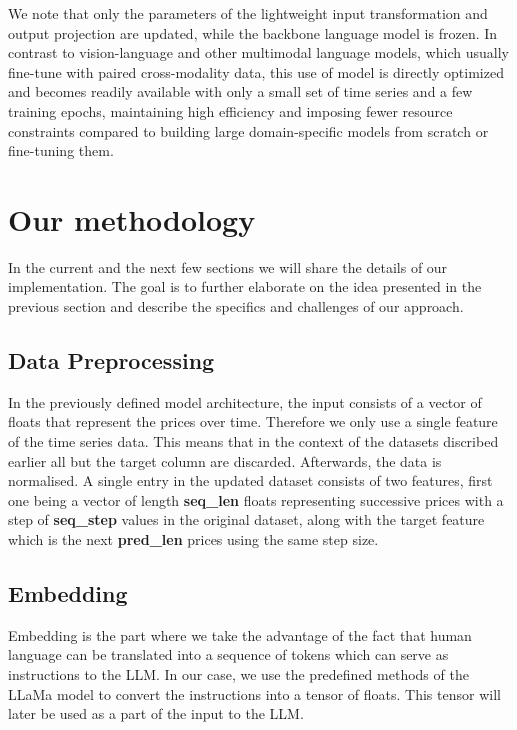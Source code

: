 We note that only the parameters of the lightweight input transformation and output projection are updated, while the backbone language model is frozen.
In contrast to vision-language and other multimodal language models, which usually fine-tune with paired cross-modality data, this use of model is directly optimized and becomes readily available with only a small set of time series and a few  training epochs, maintaining high efficiency and imposing fewer resource constraints compared to building large domain-specific models from scratch or fine-tuning them.

\section{Our methodology}
In the current and the next few sections we will share the details of our implementation. The goal is to further elaborate on the idea presented in the previous section and describe the specifics and challenges of our approach. \\

\subsection{Data Preprocessing} 
In the previously defined model architecture, the input consists of a vector of floats that represent the prices over time. Therefore we only use a single feature of the time series data. This means that in the context of the datasets discribed earlier all but the target column are discarded. Afterwards, the data is normalised. A single entry in the updated dataset consists of two features, first one being a vector of length \textbf{seq\_len} floats representing successive prices with a step of \textbf{seq\_step} values in the original dataset, along with the target feature which is the next \textbf{pred\_len} prices using the same step size. \\
\subsection{Embedding}
Embedding is the part where we take the advantage of the fact that human language can be translated into a sequence of tokens which can serve as instructions to the LLM. In our case, we use the predefined methods of the LLaMa model to convert the instructions into a tensor of floats. This tensor will later be used as a part of the input to the LLM. \\

